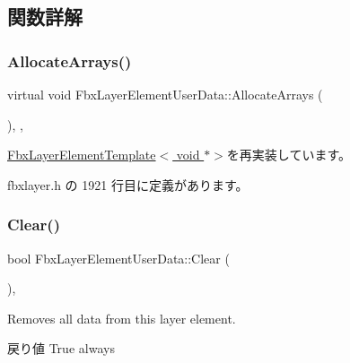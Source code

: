 \subsection{関数詳解}
\mbox{\label{class_fbx_layer_element_user_data_afd9b9cec3547a1a5ccde15f274128d2a}} 
\subsubsection{\texorpdfstring{Allocate\+Arrays()}{AllocateArrays()}}
{\footnotesize\ttfamily virtual void Fbx\+Layer\+Element\+User\+Data\+::\+Allocate\+Arrays (\begin{DoxyParamCaption}{ }\end{DoxyParamCaption})\hspace{0.3cm}{\ttfamily [inline]}, {\ttfamily [protected]}, {\ttfamily [virtual]}}



\hyperlink{class_fbx_layer_element_template_aa6d432c5865fcda1b58376119f1fcaa8}{Fbx\+Layer\+Element\+Template$<$ void $\ast$$>$}を再実装しています。



 fbxlayer.\+h の 1921 行目に定義があります。

\mbox{\label{class_fbx_layer_element_user_data_aa945631c932f3c811013c903e5ecf55e}} 
\subsubsection{\texorpdfstring{Clear()}{Clear()}}
{\footnotesize\ttfamily bool Fbx\+Layer\+Element\+User\+Data\+::\+Clear (\begin{DoxyParamCaption}{ }\end{DoxyParamCaption})\hspace{0.3cm}{\ttfamily [inline]}, {\ttfamily [virtual]}}

Removes all data from this layer element. \begin{DoxyReturn}{戻り値}
{\ttfamily True} always 
\end{DoxyReturn}


